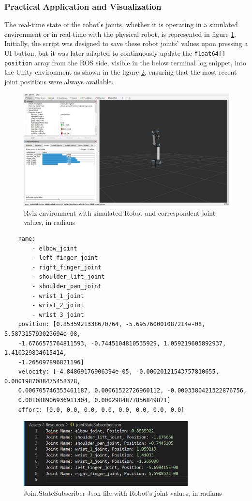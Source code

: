     
    \subsubsection{Practical Application and Visualization}
    The real-time state of the robot’s joints, whether it is operating in a simulated environment or in real-time with the physical robot, is represented in figure \ref{fig:rviz_joint_states}.
    Initially, the script was designed to save these robot joints' values upon pressing a UI button, but it was later adapted to continuously update the \texttt{float64[] position} array from the ROS side, visible in the below terminal log snippet, into the Unity environment as shown in the figure \ref{fig:json_joint_states}, ensuring that the most recent joint positions were always available.
    
    
    \begin{figure}[h]
        \centering
        \includegraphics[width=\textwidth]{figs/jointStateSubRviz.png.jpg} %
        \caption{Rviz environment with simulated Robot and correspondent joint values, in radians}
        \label{fig:rviz_joint_states}
    \end{figure}
    
    
    \begin{verbatim}
    name:
        - elbow_joint
        - left_finger_joint
        - right_finger_joint
        - shoulder_lift_joint
        - shoulder_pan_joint
        - wrist_1_joint
        - wrist_2_joint
        - wrist_3_joint
    position: [0.8535921338670764, -5.695760001087214e-08, 5.587315793023694e-08, 
    -1.6766575764811593, -0.7445104810535929, 1.059219605892937, 1.410329834615414,
    -1.265097896821196]
    velocity: [-4.84869176906394e-05, -0.00020121543757810655, 0.0001987088475458378,
    0.006705746353461187, 0.00061522726960112, -0.0003380421322876756, 
    0.001088906936911304, 0.0002984877856849871]
    effort: [0.0, 0.0, 0.0, 0.0, 0.0, 0.0, 0.0, 0.0]
    \end{verbatim}
    
    \begin{figure}[h]
        \centering
        \includegraphics[width=0.8\textwidth]{figs/jsonJointStateSub.png}
        \caption{JointStateSubscriber Json file with Robot's joint values, in radians}
        \label{fig:json_joint_states}
    \end{figure}
    
    